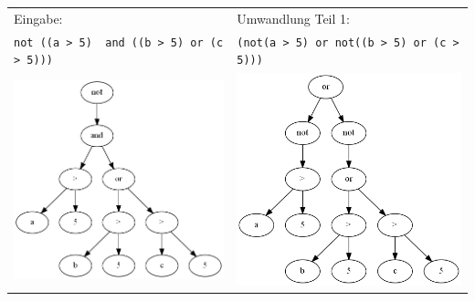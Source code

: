 \begin{tabular}{ll}
Eingabe: & Umwandlung Teil 1:\\
\verb|not ((a > 5)  and ((b > 5) or (c > 5)))| & \verb|(not(a > 5) or not((b > 5) or (c > 5)))|\\
\includegraphics[scale=0.5]{Bilder/not_graph1.png} & \includegraphics[scale=0.5]{Bilder/not_graph2.png}\\
\end{tabular}

